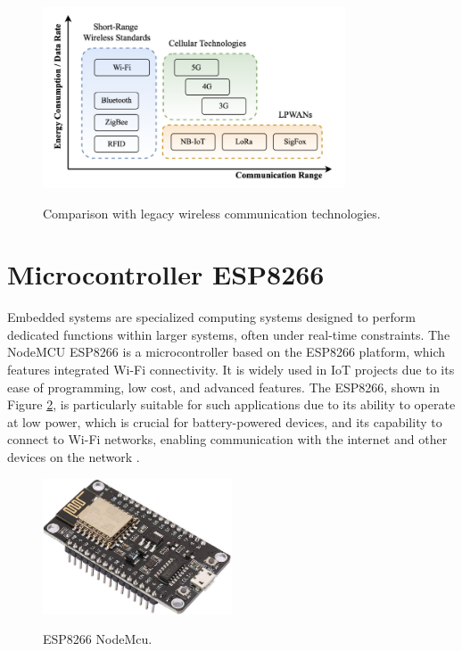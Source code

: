 \begin{figure}[h]
    \centering
    \caption{Comparison with legacy wireless communication technologies.}
    \includegraphics[width=0.8\textwidth]{figuras/Lora-comparison.png}
    \label{fig:lora}
\end{figure}

\section{Microcontroller ESP8266}

Embedded systems are specialized computing systems designed to perform dedicated functions within larger systems, often under real-time constraints. The NodeMCU ESP8266 is a microcontroller based on the ESP8266 platform, which features integrated Wi-Fi connectivity. It is widely used in \gls{IoT} projects due to its ease of programming, low cost, and advanced features. The ESP8266, shown in Figure \ref{fig:node}, is particularly suitable for such applications due to its ability to operate at low power, which is crucial for battery-powered devices, and its capability to connect to Wi-Fi networks, enabling communication with the internet and other devices on the network \cite{Kolban2016}.\cite{datasheet_2023_esp8266ex}

\begin{figure}[h]
    \centering
    \caption{ESP8266 NodeMcu.}
    \includegraphics[width=0.5\textwidth]{figuras/nodemcu.jpg}
    \label{fig:node}
\end{figure}

